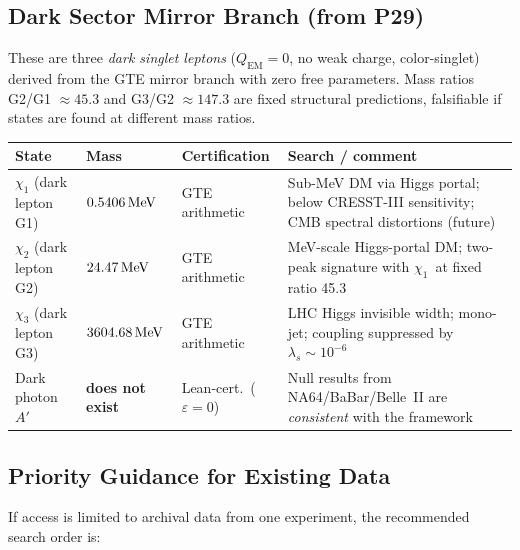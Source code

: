 \normalsize
\setlength{\tabcolsep}{6pt}

\bigskip

\subsection*{Dark Sector Mirror Branch (from P29)}

These are three \emph{dark singlet leptons} ($Q_\mathrm{EM}=0$, no weak charge,
color-singlet) derived from the GTE mirror branch with zero free parameters.
Mass ratios G2/G1 $\approx 45.3$ and G3/G2 $\approx 147.3$ are fixed structural
predictions, falsifiable if states are found at different mass ratios.

\medskip
\setlength{\tabcolsep}{5pt}
\renewcommand{\arraystretch}{1.4}
\small
\begin{tabular}{L{0.24\textwidth}C{0.10\textwidth}L{0.13\textwidth}L{0.40\textwidth}}
\toprule
\textbf{State} & \textbf{Mass} & \textbf{Certification} & \textbf{Search / comment} \\
\midrule
$\chi_1$ (dark lepton G1) & $0.5406\,\mathrm{MeV}$ & GTE arithmetic & Sub-MeV DM via Higgs portal;
  below CRESST-III sensitivity; CMB spectral distortions (future) \\
$\chi_2$ (dark lepton G2) & $24.47\,\mathrm{MeV}$  & GTE arithmetic & MeV-scale Higgs-portal DM;
  two-peak signature with $\chi_1$\allowbreak\ at fixed ratio 45.3 \\
$\chi_3$ (dark lepton G3) & $3604.68\,\mathrm{MeV}$ & GTE arithmetic & LHC Higgs invisible width;
  mono-jet; coupling suppressed by\newline $\lambda_s \sim 10^{-6}$ \\
Dark photon $A'$ & \textbf{does not exist} & Lean-cert.\ ($\varepsilon=0$) &
  Null results from NA64/BaBar/Belle~II are \emph{consistent} with the framework \\
\bottomrule
\end{tabular}
\normalsize
\setlength{\tabcolsep}{6pt}

\bigskip

\subsection*{Priority Guidance for Existing Data}

If access is limited to archival data from one experiment, the recommended search
order is:

